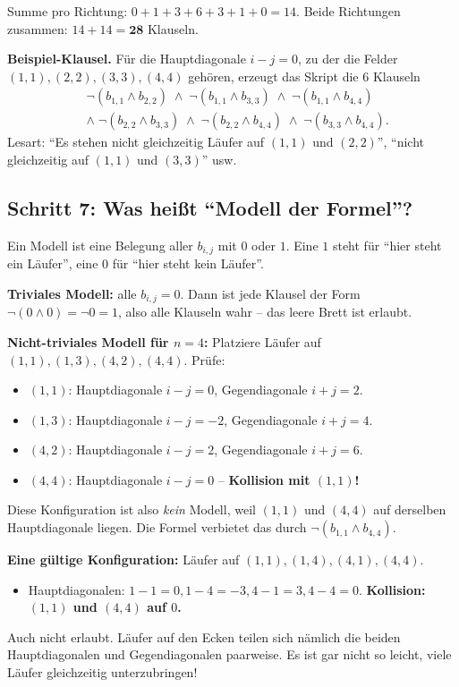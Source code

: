\documentclass[a4paper,12pt]{article}
\begin{document}
Summe pro Richtung: $0 + 1 + 3 + 6 + 3 + 1 + 0 = 14$. Beide Richtungen
zusammen: $14 + 14 = \mathbf{28}$ Klauseln.

\textbf{Beispiel-Klausel.} F\"ur die Hauptdiagonale $i - j = 0$,
zu der die Felder $(1,1), (2,2), (3,3), (4,4)$ geh\"oren, erzeugt das
Skript die $6$ Klauseln
\begin{align*}
& \neg(b_{1,1} \wedge b_{2,2}) \;\wedge\; \neg(b_{1,1} \wedge b_{3,3}) \;\wedge\; \neg(b_{1,1} \wedge b_{4,4}) \\
& \wedge\; \neg(b_{2,2} \wedge b_{3,3}) \;\wedge\; \neg(b_{2,2} \wedge b_{4,4}) \;\wedge\; \neg(b_{3,3} \wedge b_{4,4}).
\end{align*}
Lesart: "`Es stehen nicht gleichzeitig L\"aufer auf $(1,1)$ und
$(2,2)$"', "`nicht gleichzeitig auf $(1,1)$ und $(3,3)$"' usw.

\subsection*{Schritt 7: Was hei{\ss}t "`Modell der Formel"'?}

Ein Modell ist eine Belegung aller $b_{i,j}$ mit $0$ oder $1$. Eine
$1$ steht f\"ur "`hier steht ein L\"aufer"', eine $0$ f\"ur "`hier
steht kein L\"aufer"'.

\textbf{Triviales Modell:} alle $b_{i,j} = 0$. Dann ist jede Klausel
der Form $\neg(0 \wedge 0) = \neg 0 = 1$, also alle Klauseln wahr
-- das leere Brett ist erlaubt.

\textbf{Nicht-triviales Modell f\"ur $n = 4$:} Platziere L\"aufer auf
$(1,1), (1,3), (4,2), (4,4)$. Pr\"ufe:
\begin{itemize}[nosep]
\item $(1,1)$: Hauptdiagonale $i-j = 0$, Gegendiagonale $i+j = 2$.
\item $(1,3)$: Hauptdiagonale $i-j = -2$, Gegendiagonale $i+j = 4$.
\item $(4,2)$: Hauptdiagonale $i-j = 2$, Gegendiagonale $i+j = 6$.
\item $(4,4)$: Hauptdiagonale $i-j = 0$ -- \textbf{Kollision mit
      $(1,1)$!}
\end{itemize}
Diese Konfiguration ist also \emph{kein} Modell, weil $(1,1)$ und
$(4,4)$ auf derselben Hauptdiagonale liegen. Die Formel verbietet
das durch $\neg(b_{1,1} \wedge b_{4,4})$.

\textbf{Eine g\"ultige Konfiguration:} L\"aufer auf $(1,1), (1,4),
(4,1), (4,4)$.
\begin{itemize}[nosep]
\item Hauptdiagonalen: $1-1=0, 1-4=-3, 4-1=3, 4-4=0$.
      \textbf{Kollision: $(1,1)$ und $(4,4)$ auf $0$.}
\end{itemize}
Auch nicht erlaubt. L\"aufer auf den Ecken teilen sich n\"amlich die
beiden Hauptdiagonalen und Gegendiagonalen paarweise. Es ist
gar nicht so leicht, viele L\"aufer gleichzeitig unterzubringen!
\end{document}
